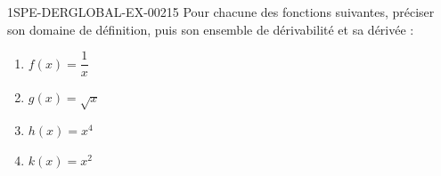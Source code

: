 \begin{exercice}{1SPE-DERGLOBAL-EX-002}{1}{5}
Pour chacune des fonctions suivantes, préciser son domaine de définition,
puis son ensemble de dérivabilité et sa dérivée :
\begin{enumerate}
  \item $f(x) = \dfrac{1}{x}$
  \item $g(x) = \sqrt{x}$
  \item $h(x) = x^4$
  \item $k(x) = x^2$
\end{enumerate}
\end{exercice}

